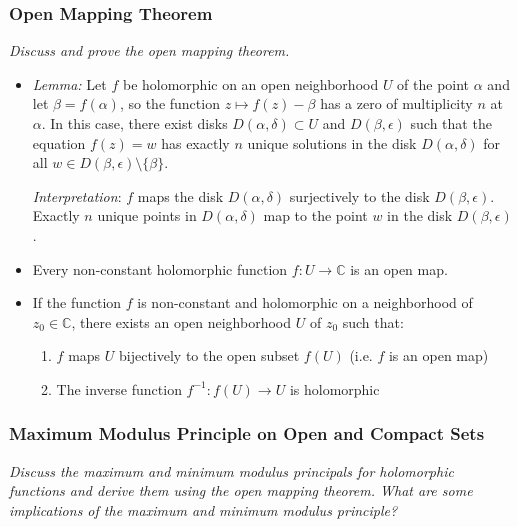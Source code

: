 \documentclass[11pt, a4paper]{article}
\newcommand{\question}[1]{\textit{#1}\vspace{2mm}}
\newcommand{\C}{\mathbb{C}} %
\begin{document}
\subsubsection{Open Mapping Theorem}
\question{Discuss and prove the open mapping theorem.}
\begin{itemize}
	\item \textit{Lemma:} Let $ f $ be holomorphic on an open neighborhood $ U $ of the point $ \alpha $ and let $ \beta = f(\alpha) $, so the function $ z \mapsto f(z) - \beta $ has a zero of multiplicity $ n $ at $ \alpha $. In this case, there exist disks $ D(\alpha, \delta) \subset U $ and $ D(\beta, \epsilon) $ such that the equation $ f(z) = w $ has exactly $ n $ unique solutions in the disk $ D(\alpha, \delta) $ for all $ w \in D(\beta, \epsilon) \setminus \{\beta \} $. 
	
	\vspace{2mm}
	\textit{Interpretation}: $ f $ maps the disk $ D(\alpha, \delta) $ surjectively to the disk $ D(\beta, \epsilon) $. Exactly $ n $ unique points in $ D(\alpha, \delta) $ map to the point $ w $ in the disk $ D(\beta, \epsilon) $.
	
	\item Every non-constant holomorphic function $ f : U \to \C $ is an open map.
	
	\item If the function $ f $ is non-constant and holomorphic on a neighborhood of $ z_0 \in \C $, there exists an open neighborhood $ U $ of $ z_0 $ such that:
	\begin{enumerate}
		\item $ f $ maps $ U $ bijectively to the open subset $ f(U) $ (i.e. $ f $ is an open map)
		\item The inverse function $ f^{-1}: f(U) \to U $ is holomorphic
	\end{enumerate}
	
\end{itemize}

\subsubsection{Maximum Modulus Principle on Open and Compact Sets}
\question{Discuss the maximum and minimum modulus principals for holomorphic functions and derive them using the open mapping theorem. What are some implications of the maximum and minimum modulus principle?}
\end{document}
